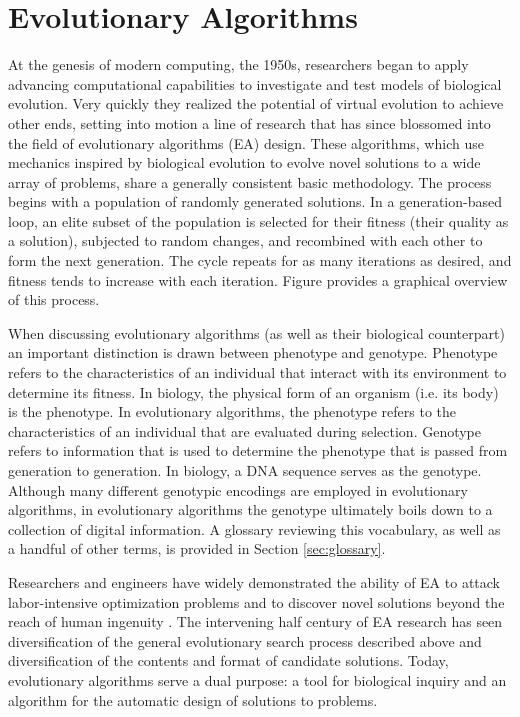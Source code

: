 \section{Evolutionary Algorithms}

At the genesis of modern computing, the 1950s, researchers began to apply advancing computational capabilities to investigate and test models of biological evolution. Very quickly they realized the potential of virtual evolution to achieve other ends, setting into motion a line of research that has since blossomed into the field of evolutionary algorithms (EA) design. These algorithms, which use mechanics inspired by biological evolution to evolve novel solutions to a wide array of problems, share a generally consistent basic methodology. The process begins with a population of randomly generated solutions. In a generation-based loop, an elite subset of the population is selected for their fitness (their quality as a solution), subjected to random changes, and recombined with each other to form the next generation. The cycle repeats for as many iterations as desired, and fitness tends to increase with each iteration. Figure  provides a graphical overview of this process.

When discussing evolutionary algorithms (as well as their biological counterpart) an important distinction is drawn between phenotype and genotype. Phenotype refers to the characteristics of an individual that interact with its environment to determine its fitness. In biology, the physical form of an organism (i.e. its body) is the phenotype. In evolutionary algorithms, the phenotype refers to the characteristics of an individual that are evaluated during selection. Genotype refers to information that is used to determine the phenotype that is passed from generation to generation. In biology, a DNA sequence serves as the genotype. Although many different genotypic encodings are employed in evolutionary algorithms, in evolutionary algorithms the genotype ultimately boils down to a collection of digital information. A glossary reviewing this vocabulary, as well as a handful of other terms, is provided in Section \ref{sec:glossary}.


Researchers and engineers have widely demonstrated the ability of EA to attack labor-intensive optimization problems and to discover novel solutions beyond the reach of human ingenuity \cite{Poli2008AProgramming}. The intervening half century of EA research has seen diversification of the general evolutionary search process described above and diversification of the contents and format of candidate solutions. Today, evolutionary algorithms serve a dual purpose: a tool for biological inquiry and an algorithm for the automatic design of solutions to problems.